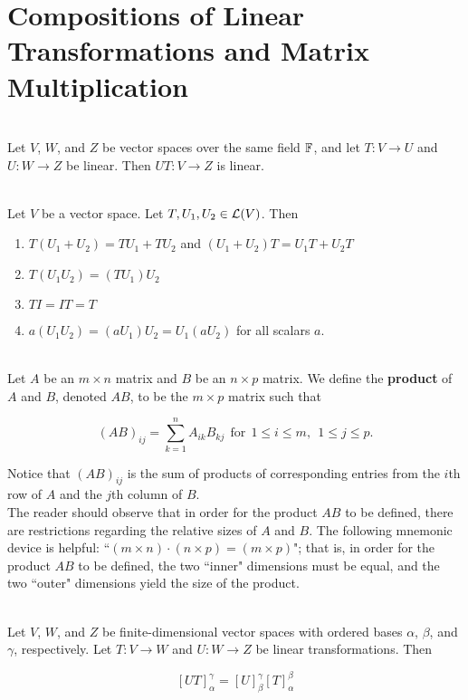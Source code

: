 \section{Compositions of Linear Transformations and Matrix Multiplication}

\begin{theorem}
	\hfill\\
	Let $V$, $W$, and $Z$ be vector spaces over the same field $\mathbb{F}$, and let $T: V \to U$ and $U: W \to Z$ be linear. Then $UT: V \to Z$ is linear.
\end{theorem}

\begin{theorem}
	\hfill\\
	Let $V$ be a vector space. Let $T, U_1, U_2 \in \mathcal{L}(V)$. Then
	
	\begin{enumerate}
		\item $T(U_1 + U_2) = TU_1 + TU_2$ and $(U_1 + U_2)T = U_1T + U_2T$
		\item $T(U_1U_2) = (TU_1)U_2$
		\item $TI = IT = T$
		\item $a(U_1U_2) = (aU_1)U_2 = U_1(aU_2)$ for all scalars $a$.
	\end{enumerate}
\end{theorem}

\begin{definition}
	\hfill\\
	Let $A$ be an $m \times n$ matrix and $B$ be an $n \times p$ matrix. We define the \textbf{product} of $A$ and $B$, denoted $AB$, to be the $m \times p$ matrix such that
	
	\[(AB)_{ij} = \sum_{k=1}^{n}A_{ik}B_{kj}\ \ \text{for}\ \ 1 \leq i \leq m,\ \ 1 \leq j \leq p.\]
	
	Notice that $(AB)_{ij}$ is the sum of products of corresponding entries from the $i$th row of $A$ and the $j$th column of $B$.\\
	
	The reader should observe that in order for the product $AB$ to be defined, there are restrictions regarding the relative sizes of $A$ and $B$. The following mnemonic device is helpful: ``$(m \times n) \cdot (n \times p) = (m \times p)$"; that is, in order for the product $AB$ to be defined, the two ``inner" dimensions must be equal, and the two ``outer" dimensions yield the size of the product.
\end{definition}

\begin{theorem}
	\hfill\\
	Let $V$, $W$, and $Z$ be finite-dimensional vector spaces with ordered bases $\alpha$, $\beta$, and $\gamma$, respectively. Let $T: V \to W$ and $U: W \to Z$ be linear transformations. Then
	
	\[[UT]_\alpha^\gamma = [U]_\beta^\gamma[T]_\alpha^\beta\]
\end{theorem}

